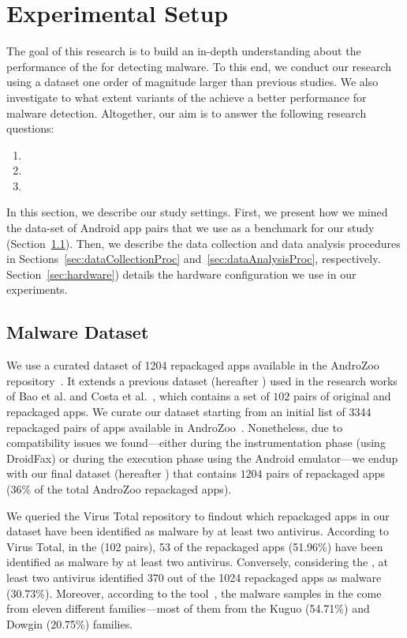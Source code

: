 \section{Experimental Setup}\label{sec:experimentalSetup}

The goal of this research is to build an in-depth understanding about
the performance of the \mas for detecting malware. To this
end, we conduct our research using a dataset one order of magnitude
larger than previous studies. We also investigate to what
extent variants of the \mas achieve a better performance
for malware detection. Altogether, our
aim is to answer the following research questions:

\begin{enumerate}[(RQ1)]
\item \rqa
\item \rqb
\item \rqc  
\end{enumerate}

In this section, we describe our study settings. First, we present how we mined the data-set of Android app pairs that we
use as a benchmark for our study (Section~\ref{sec:dataset}).  Then, we describe the data collection and
data analysis procedures in Sections~\ref{sec:dataCollectionProc} and~\ref{sec:dataAnalysisProc},
respectively. Section~\ref{sec:hardware}) details the hardware configuration we use in our
experiments.


\subsection{Malware Dataset}\label{sec:dataset}

We use a curated dataset of \num{1204} repackaged apps available in the AndroZoo repository~\cite{DBLP:conf/msr/AllixBKT16}.
It extends a previous dataset (hereafter \sds) used in the research works of Bao et al. and Costa et al.~\cite{DBLP:conf/wcre/BaoLL18,DBLP:conf/scam/CostaMCMVBC20},
which contains a set of $102$ pairs of original and repackaged apps.
We curate our dataset starting from an initial list of \num{3344} repackaged pairs of apps available in AndroZoo~\cite{DBLP:conf/msr/AllixBKT16}.
Nonetheless, due to compatibility issues we found---either during the instrumentation phase (using DroidFax) or during the execution
phase using the Android emulator---we endup with our final dataset (hereafter \cds) that contains $1204$ pairs of
repackaged apps (36\% of the total AndroZoo repackaged apps). 

We queried the Virus Total repository to findout which repackaged apps in our
dataset have been identified as malware by at least two antivirus. According to Virus Total, in the \sds (102 pairs),
53 of the repackaged apps (51.96\%) have been identified as malware by at least two
antivirus. Conversely, considering the \cds, at least two antivirus identified 370 out of the 1024 repackaged apps as malware (30.73\%).
Moreover, according to the
\avt tool~\cite{avclass2-paper}, the malware samples in the \sds come from eleven different families---most of them from the Kuguo (54.71\%) and Dowgin (20.75\%) families.

